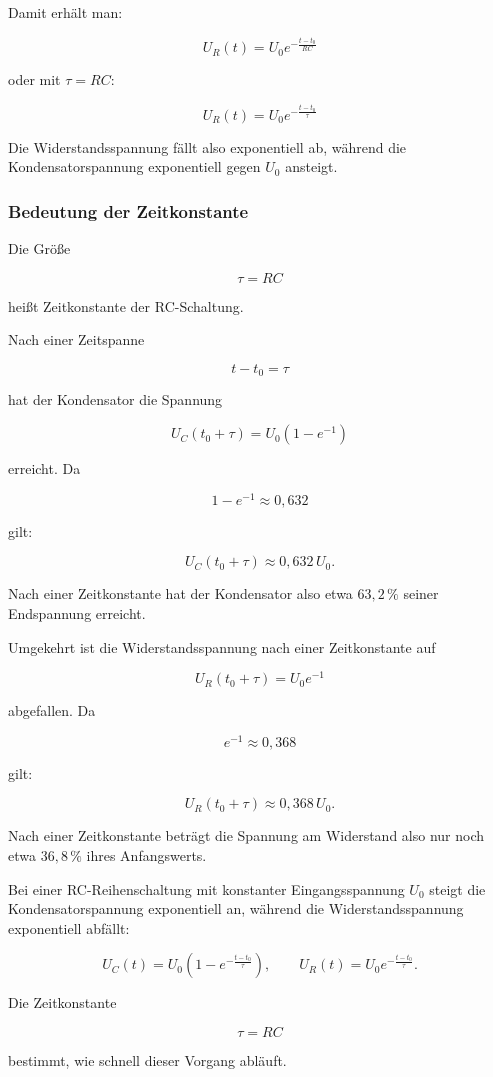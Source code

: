 Damit erhält man:

\[
\boxed{
	U_R(t)=U_0 e^{-\frac{t-t_0}{R C}}
}
\]

oder mit $\tau=RC$:

\[
\boxed{
	U_R(t)=U_0 e^{-\frac{t-t_0}{\tau}}
}
\]

Die Widerstandsspannung fällt also exponentiell ab, während die
Kondensatorspannung exponentiell gegen $U_0$ ansteigt.

\subsubsection{Bedeutung der Zeitkonstante}
\label{subsubsec:bedeutung-zeitkonstante-rc-schaltung}

Die Größe

\[
\boxed{
	\tau = R C
}
\]

heißt Zeitkonstante der RC-Schaltung.

Nach einer Zeitspanne

\[
t-t_0=\tau
\]

hat der Kondensator die Spannung

\[
U_C(t_0+\tau)
=
U_0\left(1-e^{-1}\right)
\]

erreicht. Da

\[
1-e^{-1}\approx 0{,}632
\]

gilt:

\[
U_C(t_0+\tau) \approx 0{,}632\,U_0.
\]

Nach einer Zeitkonstante hat der Kondensator also etwa $63{,}2\,\%$ seiner
Endspannung erreicht.

Umgekehrt ist die Widerstandsspannung nach einer Zeitkonstante auf

\[
U_R(t_0+\tau)=U_0 e^{-1}
\]

abgefallen. Da

\[
e^{-1}\approx 0{,}368
\]

gilt:

\[
U_R(t_0+\tau)\approx 0{,}368\,U_0.
\]

Nach einer Zeitkonstante beträgt die Spannung am Widerstand also nur noch etwa
$36{,}8\,\%$ ihres Anfangswerts.

\begin{DidacticBox}
	\label{box:merksatz-rc-schaltung}
	Bei einer RC-Reihenschaltung mit konstanter Eingangsspannung $U_0$ steigt die
	Kondensatorspannung exponentiell an, während die Widerstandsspannung
	exponentiell abfällt:
	
	\[
	U_C(t)=U_0\left(1-e^{-\frac{t-t_0}{\tau}}\right),
	\qquad
	U_R(t)=U_0 e^{-\frac{t-t_0}{\tau}}.
	\]
	
	Die Zeitkonstante
	
	\[
	\tau=RC
	\]
	
	bestimmt, wie schnell dieser Vorgang abläuft.
\end{DidacticBox}